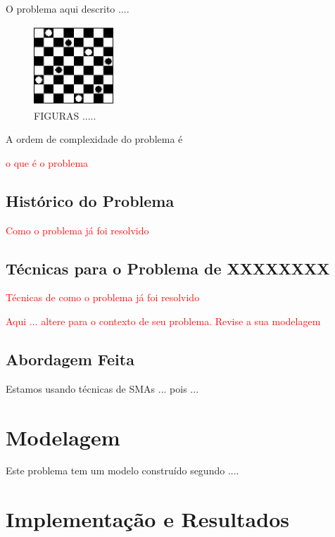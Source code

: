 \documentclass[12pt,final,a4paper]{article}
\theoremstyle{definition}
\begin{document}
O problema aqui descrito ....
\begin{figure}[!ht]
\centering
\includegraphics[height=3.0cm,width=3.0cm,angle=0]{figuras/8QueensSolution.eps}
\caption{ FIGURAS .....}
\label{fig:8QueensSolution}
\end{figure}

A ordem de complexidade do problema é 



\textcolor{red}{o que é o problema}

\subsection{Histórico do Problema}

\textcolor{red}{Como o problema já foi resolvido}



\subsection{Técnicas para o Problema de XXXXXXXX}

\textcolor{red}{Técnicas de como o problema já foi resolvido}



{\Large \textcolor{red}{Aqui ... altere para o 
contexto de seu problema. Revise a sua modelagem}}


\subsection{Abordagem Feita}

Estamos usando técnicas de SMAs ... pois ...


\section{Modelagem}
\label{sec_modelagem}

Este problema tem um modelo construído segundo ....



\section{Implementação e Resultados}
\label{sec_implementacao}
\end{document}
